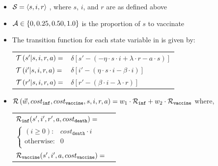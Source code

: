 \begin{itemize}
    \item {\footnotesize $ \mathcal{S} = \left\langle s, i, r \right\rangle$ }, where $ s $, $ i $, and $ r $ are as defined above
    \item {\footnotesize $ \mathcal{A} \in \left\lbrace 0, 0.25, 0.50, 1.0 \right\rbrace $} is the proportion of $ s $ to vaccinate
    \item The transition function {\footnotesize \Transition} for each state variable in {\footnotesize \State} is given by:    \\
    {\footnotesize 
        \abovedisplayskip=5pt
        \belowdisplayskip=0pt
        \renewcommand{\arraystretch}{1.5}
        \begin{tabular}{ll}
            $ \mathcal{T}\left( s' | s, i, r, a \right) =$ & $ \delta \left[ s' - (- \eta \cdot s \cdot i + \lambda \cdot r -a \cdot s) \right] $ \\
            $ \mathcal{T}\left( i' | s, i, r, a \right) =$ & $ \delta \left[ i' - (\eta \cdot s \cdot i - \beta \cdot i) \right] $ \\
            $ \mathcal{T}\left( r' | s, i, r, a \right) =$ & $ \delta \left[ r' - (\beta \cdot i - \lambda \cdot r) \right] $ \\            
        \end{tabular}
    }%
    \item {\footnotesize $ \mathcal{R}\left(\vec{w}, cost_{\mathtt{inf}}, cost_{\mathtt{vaccine}}, s, i, r, a \right) = w_1 \cdot \mathcal{R}_{\mathtt{inf}} + w_2 \cdot \mathcal{R}_{\mathtt{vaccine}}$} where, \\
    {\footnotesize 
        \abovedisplayskip=10pt
        \belowdisplayskip=0pt
        \renewcommand{\arraystretch}{1.5}
        \begin{tabular}{ll}    
            $ \mathcal{R}_{\mathtt{inf}}(s', i', r', a, cost_{\mathtt{death}}) = $ &  $ $ \\
            \qquad $ \begin{cases}
            (i \geq 0) : & cost_{\mathtt{death}} \cdot i \\
            \text{otherwise} : & 0 \\
            \end{cases} $ & $ $ \\
            $ \mathcal{R}_{\mathtt{vaccine}}(s', i', a, cost_{\mathtt{vaccine}}) = $ &  $ $ \\

\end{tabular}}
\end{itemize}
